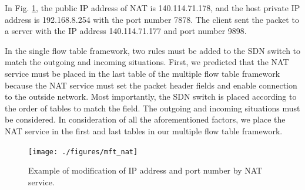\documentclass[conference]{IEEEtran}
\begin{document}
In Fig. \ref{fig:mft_nat}, the public IP address of NAT is 140.114.71.178, and the host private IP address is 192.168.8.254 with the port number 7878. The client sent the packet to a server with the IP address 140.114.71.177 and port number 9898.


In the single flow table framework, two rules must be added to the SDN switch to match the outgoing and incoming situations.
First, we predicted that the NAT service must be placed in the last table of the multiple flow table framework because the NAT service must set the packet header fields and enable connection to the outside network.
Most importantly, the SDN switch is placed according to the order of tables to match the field.
The outgoing and incoming situations must be considered.
In consideration of all the aforementioned factors, we place the NAT service in the first and last tables in our multiple flow table framework.

\begin{figure}[!t]
\centering
\texttt{[image: ./figures/mft\_nat]}
\caption{Example of modification of IP address and port number by NAT service.}
\label{fig:mft_nat}
\end{figure}
%
\end{document}
